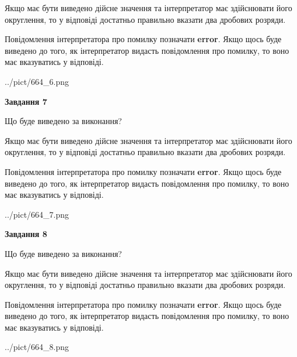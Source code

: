 \documentclass[12pt, ukrainian]{article}
\begin{document}
{\begin {Large}
Якщо має бути виведено дійсне значення та інтерпретатор має здійснювати його округлення, 
то у відповіді достатньо правильно вказати два дробових розряди.

Повідомлення інтерпретатора про помилку позначати \textbf{error}.
Якщо щось буде виведено до того, як інтерпретатор видасть повідомлення про помилку, 
то воно має вказуватись у відповіді. \par

\begin{center}
	{../pict/664_6.png}
\end{center}
\newpage

{\begin {center}\textbf{Завдання 7}\end {center}}\par
Що буде виведено за виконання? \par

Якщо має бути виведено дійсне значення та інтерпретатор має здійснювати його округлення, 
то у відповіді достатньо правильно вказати два дробових розряди.

Повідомлення інтерпретатора про помилку позначати \textbf{error}.
Якщо щось буде виведено до того, як інтерпретатор видасть повідомлення про помилку, 
то воно має вказуватись у відповіді. \par

\begin{center}
	{../pict/664_7.png}
\end{center}
\newpage

{\begin {center}\textbf{Завдання 8}\end {center}}\par
Що буде виведено за виконання? \par

Якщо має бути виведено дійсне значення та інтерпретатор має здійснювати його округлення, 
то у відповіді достатньо правильно вказати два дробових розряди.

Повідомлення інтерпретатора про помилку позначати \textbf{error}.
Якщо щось буде виведено до того, як інтерпретатор видасть повідомлення про помилку, 
то воно має вказуватись у відповіді. \par

\begin{center}
	{../pict/664_8.png}
\end{center}
\newpage


\end{Large}}
\end{document}
